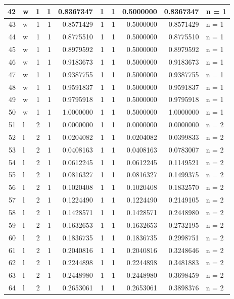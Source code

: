 \documentclass[
  letterpaper,
  DIV=11,
  numbers=noendperiod]{scrreprt}
\begin{document}
\begin{table}
\begin{tabular}[t]{r|l|r|r|r|r|r|r|r|l}
\hline
42 & w & 1 & 1 & 0.8367347 & 1 & 1 & 0.5000000 & 0.8367347 & n = 1\\
\hline
43 & w & 1 & 1 & 0.8571429 & 1 & 1 & 0.5000000 & 0.8571429 & n = 1\\
\hline
44 & w & 1 & 1 & 0.8775510 & 1 & 1 & 0.5000000 & 0.8775510 & n = 1\\
\hline
45 & w & 1 & 1 & 0.8979592 & 1 & 1 & 0.5000000 & 0.8979592 & n = 1\\
\hline
46 & w & 1 & 1 & 0.9183673 & 1 & 1 & 0.5000000 & 0.9183673 & n = 1\\
\hline
47 & w & 1 & 1 & 0.9387755 & 1 & 1 & 0.5000000 & 0.9387755 & n = 1\\
\hline
48 & w & 1 & 1 & 0.9591837 & 1 & 1 & 0.5000000 & 0.9591837 & n = 1\\
\hline
49 & w & 1 & 1 & 0.9795918 & 1 & 1 & 0.5000000 & 0.9795918 & n = 1\\
\hline
50 & w & 1 & 1 & 1.0000000 & 1 & 1 & 0.5000000 & 1.0000000 & n = 1\\
\hline
51 & l & 2 & 1 & 0.0000000 & 1 & 1 & 0.0000000 & 0.0000000 & n = 2\\
\hline
52 & l & 2 & 1 & 0.0204082 & 1 & 1 & 0.0204082 & 0.0399833 & n = 2\\
\hline
53 & l & 2 & 1 & 0.0408163 & 1 & 1 & 0.0408163 & 0.0783007 & n = 2\\
\hline
54 & l & 2 & 1 & 0.0612245 & 1 & 1 & 0.0612245 & 0.1149521 & n = 2\\
\hline
55 & l & 2 & 1 & 0.0816327 & 1 & 1 & 0.0816327 & 0.1499375 & n = 2\\
\hline
56 & l & 2 & 1 & 0.1020408 & 1 & 1 & 0.1020408 & 0.1832570 & n = 2\\
\hline
57 & l & 2 & 1 & 0.1224490 & 1 & 1 & 0.1224490 & 0.2149105 & n = 2\\
\hline
58 & l & 2 & 1 & 0.1428571 & 1 & 1 & 0.1428571 & 0.2448980 & n = 2\\
\hline
59 & l & 2 & 1 & 0.1632653 & 1 & 1 & 0.1632653 & 0.2732195 & n = 2\\
\hline
60 & l & 2 & 1 & 0.1836735 & 1 & 1 & 0.1836735 & 0.2998751 & n = 2\\
\hline
61 & l & 2 & 1 & 0.2040816 & 1 & 1 & 0.2040816 & 0.3248646 & n = 2\\
\hline
62 & l & 2 & 1 & 0.2244898 & 1 & 1 & 0.2244898 & 0.3481883 & n = 2\\
\hline
63 & l & 2 & 1 & 0.2448980 & 1 & 1 & 0.2448980 & 0.3698459 & n = 2\\
\hline
64 & l & 2 & 1 & 0.2653061 & 1 & 1 & 0.2653061 & 0.3898376 & n = 2\\

\end{tabular}
\end{table}
\end{document}
